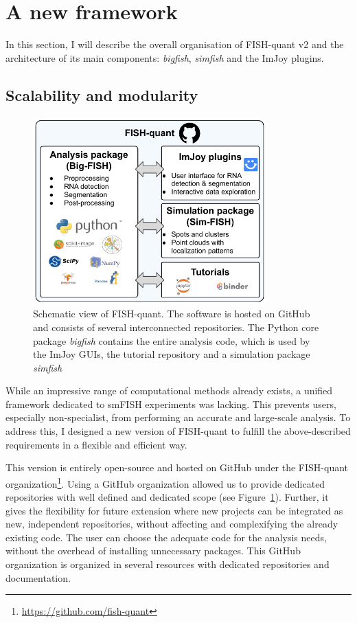 \section{A new framework}
\label{sec:fqv2}

In this section, I will describe the overall organisation of FISH-quant v2 and the architecture of its main components: \emph{bigfish}, \emph{simfish} and the ImJoy plugins.

\subsection{Scalability and modularity}
\label{subsec:framework}

\begin{figure}[h]
    \centering
    \includegraphics[width=0.8\textwidth]{figures/chapter1/schema_fishquant}
    \caption{Schematic view of FISH-quant.
	The software is hosted on GitHub and consists of several interconnected repositories.
	The Python core package \emph{bigfish} contains the entire analysis code, which is used by the ImJoy GUIs, the tutorial repository and a simulation package \emph{simfish}}
    \label{fig:fishquant}
\end{figure}

While an impressive range of computational methods already exists, a unified framework dedicated to \ac{smFISH} experiments was lacking.
This prevents users, especially non-specialist, from performing an accurate and large-scale analysis.
To address this, I designed a new version of FISH-quant to fulfill the above-described requirements in a flexible and efficient way.

This version is entirely open-source and hosted on GitHub under the FISH-quant organization\footnote{\url{https://github.com/fish-quant}}.
Using a GitHub organization allowed us to provide dedicated repositories with well defined and dedicated scope (see Figure~\ref{fig:fishquant}).
Further, it gives the flexibility for future extension where new projects can be integrated as new, independent repositories, without affecting and complexifying the already existing code.
The user can choose the adequate code for the analysis needs, without the overhead of installing unnecessary packages.
This GitHub organization is organized in several resources with dedicated repositories and documentation.

